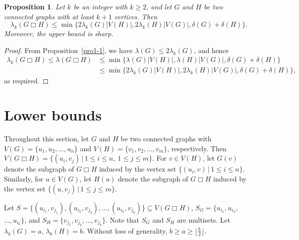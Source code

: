 \documentclass[final]{dmtcs-episciences}
\newtheorem{proposition}{Proposition}[section]
\begin{document}
\begin{proposition}\label{pro-Upper}
Let $k$ be an integer with $k\geq 2$, and let $G$ and $H$ be two
connected graphs with at least $k+1$ vertices. Then
\[
\lambda_k(G\Box H)\leq
\min\{2\lambda_k(G)|V(H)|,2\lambda_k(H)|V(G)|,\delta(G)+\delta(H)\}.
\]
Moreover, the upper bound is sharp.
\end{proposition}
\begin{proof}
From Proposition~\ref{pro1-1}, we have $\lambda(G)\leq
2\lambda_k(G)$, and hence
\begin{align*}
\lambda_k(G\Box H)\leq \lambda(G\Box H) &\leq \min \{\lambda(G)
|V(H)|,\lambda(H)
|V(G)|,\delta(G)+\delta(H)\}\\[0.2cm]
&\leq \min \{2\lambda_k(G) |V(H)|,2\lambda_k(H)
|V(G)|,\delta(G)+\delta(H)\},
\end{align*}
as required.
\end{proof}

\section{Lower bounds}

Throughout this section, let $G$ and $H$ be two connected graphs with
$V(G)=\{u_1,u_2,\ldots,u_{n}\}$ and $V(H)=\{v_1,v_2,\ldots,v_{m}\}$,
respectively. Then $V(G\Box H)=\{(u_i,v_j)\,|\,1\leq i\leq n, \
1\leq j\leq m\}$. For $v\in V(H)$, let $G(v)$ denote the
subgraph of $G\Box H$ induced by the vertex set $\{(u_i,v)\,|\,1\leq
i\leq n\}$. Similarly, for $u\in V(G)$, let $H(u)$ denote the
subgraph of $G\Box H$ induced by the vertex set $\{(u,v_j)\,|\,1\leq
j\leq m\}$.

Let
$S=\{(u_{i_1},v_{j_1}),(u_{i_2},v_{j_2}),\ldots,(u_{i_k},v_{j_k})\}\subseteq
V(G\Box H)$, $S_G=\{u_{i_1},u_{i_2},$ $\ldots,u_{i_k}\}$, and
$S_H=\{v_{j_1},v_{j_2},\ldots,v_{j_k}\}$. Note that $S_G$ and $S_H$
are multisets. Let $\lambda_k(G)=a$, $\lambda_k(H)=b$. Without loss
of generality, $b\geq a\geq\lfloor\frac{k}{2}\rfloor$.
\end{document}
